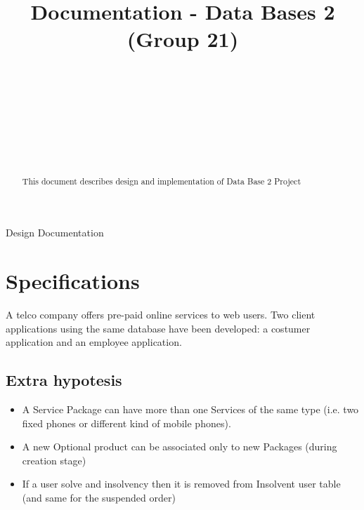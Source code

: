\documentclass{article}
\begin{document}
\lstset{language=SQL}
\title{Documentation - Data Bases 2 (Group 21)%
%
}

\author{\\[2pt] 
\\
\\
\and
\\
\\
\\
}

%
%
{Design Documentation}

\maketitle

\begin{abstract}
This document describes design and implementation of Data Base 2 Project
\end{abstract}

\section{Specifications}
\label{intro}
A telco company offers pre-paid online services to web users. Two client applications using the same database have been developed: a costumer application and an employee application.
\subsection{Extra hypotesis}
\begin{itemize}
	\item A Service Package can have more than one Services of the same type (i.e. two fixed phones or different kind of mobile phones).
	\item A new Optional product can be associated only to new Packages (during creation stage)
	\item If a user solve and insolvency then it is removed from Insolvent user table (and same for the suspended order)
\end{itemize}
\newpage
\end{document}
